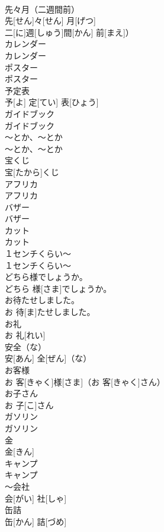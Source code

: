 \documentclass[8pt]{extreport}
\begin{document}
\begin{CJK}{UTF8}{min}
\\	先々月（二週間前）	
\\	先[せん]々[せん] 月[げつ]
\\	二[に]週[しゅう]間[かん] 前[まえ]）		
\\	カレンダー	
\\	カレンダー		
\\	ポスター	
\\	ポスター		
\\	予定表	
\\	予[よ] 定[てい] 表[ひょう]		
\\	ガイドブック	
\\	ガイドブック		
\\	～とか、～とか	
\\	～とか、～とか		
\\	宝くじ	
\\	宝[たから]くじ		
\\	アフリカ	
\\	アフリカ		
\\	バザー	
\\	バザー		
\\	カット	
\\	カット		
\\	１センチくらい～	
\\	１センチくらい～		
\\	どちら様でしょうか。	
\\	どちら 様[さま]でしょうか。		
\\	お待たせしました。	
\\	お 待[ま]たせしました。		
\\	お礼	
\\	お 礼[れい]		
\\	安全（な）	
\\	安[あん] 全[ぜん]（な）		
\\	お客様	
\\	お 客[きゃく]様[さま]（お 客[きゃく]さん）		
\\	お子さん	
\\	お 子[こ]さん		
\\	ガソリン	
\\	ガソリン		
\\	金	
\\	金[きん]		
\\	キャンプ	
\\	キャンプ		
\\	～会社	
\\	会[がい] 社[しゃ]		
\\	缶詰	
\\	缶[かん] 詰[づめ]		

\end{CJK}
\end{document}
